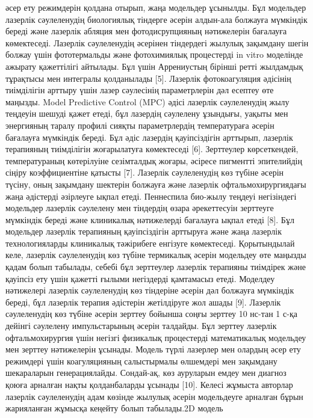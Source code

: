 әсер ету режимдерін қолдана отырып, жаңа модельдер ұсынылды. Бұл
модельдер лазерлік сәулеленудің биологиялық тіндерге әсерін алдын-ала
болжауға мүмкіндік береді және лазерлік абляция мен фотодисрупцияның
нәтижелерін бағалауға көмектеседі. Лазерлік сәулеленудің әсерінен
тіндердегі жылулық зақымдану шегін болжау үшін фототермальды және
фотохимиялық процестерді in vitro моделінде ажырату қажеттілігі
айтылады. Бұл үшін Аррениустың бірінші ретті жылдамдық тұрақтысы мен
интегралы қолданылады {[}5{]}. Лазерлік фотокоагуляция әдісінің
тиімділігін арттыру үшін лазер сәулесінің параметрлерін дәл есептеу өте
маңызды. Model Predictive Control (MPC) әдісі лазерлік сәулеленудің жылу
теңдеуін шешуді қажет етеді, бұл лазердің сәулелену ұзындығы, уақыты мен
энергияның таралу профилі сияқты параметрлердің температураға әсерін
бағалауға мүмкіндік береді. Бұл әдіс лазердің қауіпсіздігін арттырып,
лазерлік терапияның тиімділігін жоғарылатуға көмектеседі {[}6{]}.
Зерттеулер көрсеткендей, температураның көтерілуіне сезімталдық жоғары,
әсіресе пигментті эпителийдің сіңіру коэффициентіне қатысты {[}7{]}.
Лазерлік сәулеленудің көз түбіне әсерін түсіну, оның зақымдану шектерін
болжауға және лазерлік офтальмохирургиядағы жаңа әдістерді әзірлеуге
ықпал етеді. Пеннеспила био-жылу теңдеуі негізіндегі модельдер лазерлік
сәулелену мен тіндердің өзара әрекеттесуін зерттеуге мүмкіндік береді
және клиникалық нәтижелерді бағалауға ықпал етеді {[}8{]}. Бұл модельдер
лазерлік терапияның қауіпсіздігін арттыруға және жаңа лазерлік
технологияларды клиникалық тәжірибеге енгізуге көмектеседі. Қорытындылай
келе, лазерлік сәулеленудің көз түбіне термикалық әсерін модельдеу өте
маңызды қадам болып табылады, себебі бұл зерттеулер лазерлік терапияны
тиімдірек және қауіпсіз ету үшін қажетті ғылыми негіздерді қамтамасыз
етеді. Моделдеу нәтижелері лазерлік сәулеленудің көз тіндеріне әсерін
дәл болжауға мүмкіндік береді, бұл лазерлік терапия әдістерін
жетілдіруге жол ашады {[}9{]}. Лазерлік сәулеленудің көз түбіне әсерін
зерттеу бойынша соңғы зерттеу 10 нс-тан 1 с-қа дейінгі сәулелену
импульстарының әсерін талдайды. Бұл зерттеу лазерлік офтальмохирургия
үшін негізгі физикалық процестерді математикалық модельдеу мен зерттеу
нәтижелерін ұсынады. Модель түрлі лазерлер мен олардың әсер ету
режимдері үшін коагуляцияның салыстырмалы өлшемдері мен зақымдану
шекараларын генерациялайды. Сондай-ақ, көз ауруларын емдеу мен диагноз
қоюға арналған нақты қолданбаларды ұсынады {[}10{]}. Келесі жұмыста
авторлар лазерлік сәулеленудің адам көзінде жылулық әсерін модельдеуге
арналған бұрын жарияланған жұмысқа кеңейту болып табылады.2D модель
